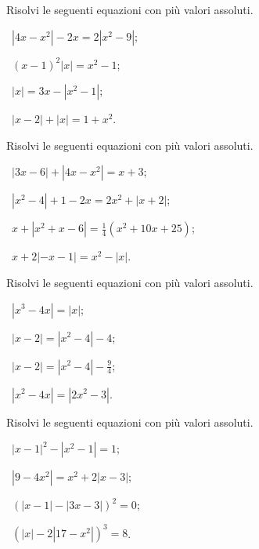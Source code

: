 \begin{esercizio}[\Ast]
 \label{ese:7.21}
Risolvi le seguenti equazioni con più valori assoluti.
\begin{multicols}{2}
 \begin{enumeratea}
 \item~$\left|4x-x^2\right|-2x=2\left|x^2-9\right|$;
 \item~$(x-1)^2\left|x\right|=x^2-1$;
 \item~$\left|x\right|=3x-\left|x^2-1\right|$;
 \item~$\left|x-2\right|+\left|x\right|=1+x^2$.
 \end{enumeratea}
 \end{multicols}
\end{esercizio}

\begin{esercizio}[\Ast]
 \label{ese:7.22}
Risolvi le seguenti equazioni con più valori assoluti.
\begin{multicols}{2}
 \begin{enumeratea}
 \item~$\left|3x-6\right|+\left|4x-x^2\right|=x+3$;
 \item~$\left|x^2-4\right|+1-2x=2x^2+\left|x+2\right|$;
 \item~$x+\left|x^2+x-6\right|=\frac 1 4(x^2+10x+25)$;
 \item~$x+2\left|-x-1\right|=x^2-\left|x\right|$.
 \end{enumeratea}
 \end{multicols}
\end{esercizio}

\begin{esercizio}[\Ast]
 \label{ese:7.23}
Risolvi le seguenti equazioni con più valori assoluti.
\begin{multicols}{2}
 \begin{enumeratea}
 \item~$\left|x^3-4x\right|=\left|x\right|$;
 \item~$\left|x-2\right|=\left|x^2-4\right|-4$;
 \item~$\left|x-2\right|=\left|x^2-4\right|-\frac 9 4$;
 \item~$\left|x^2-4x\right|=\left|2x^2-3\right|$.
 \end{enumeratea}
 \end{multicols}
\end{esercizio}

\begin{esercizio}[\Ast]
 \label{ese:7.24}
Risolvi le seguenti equazioni con più valori assoluti.
\begin{multicols}{2}
 \begin{enumeratea}
 \item~$\left|x-1\right|^2-\left|x^2-1\right|=1$;
 \item~$\left|9-4x^2\right|=x^2+2\left|x-3\right|$;
 \item~$(\left|x-1\right|-\left|3x-3\right|)^2=0$;
 \item~$\left(\left|x\right|-2\left|17-x^2\right|\right)^3=8$.
 \end{enumeratea}
 \end{multicols}
\end{esercizio}

